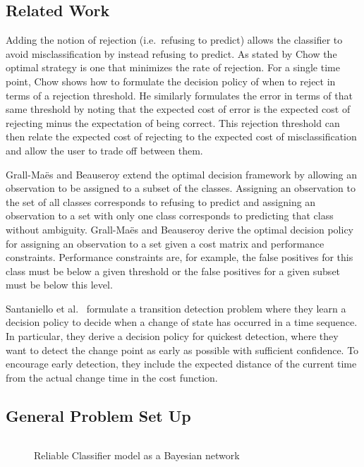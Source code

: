 \documentclass[12pt,solutions]{article}
\begin{document}
\subsection{Related Work}

Adding the notion of rejection (i.e.\  refusing to predict) allows the classifier to avoid misclassification by instead refusing to predict. As stated by Chow \cite{Chow1970} the optimal strategy is one that minimizes the rate of rejection. For a single time point, Chow shows how to formulate the decision policy of when to reject in terms of a rejection threshold. He similarly formulates the error in terms of that same threshold by noting that the expected cost of error is the expected cost of rejecting minus the expectation of being correct. This rejection threshold can then relate the expected cost of rejecting to the expected cost of misclassification and allow the user to trade off between them. 

Grall-Ma\"{e}s and  Beauseroy \cite{GrallMaes2009} extend the optimal decision framework by allowing an observation to be assigned to a subset of the classes. Assigning an observation to the set of all classes corresponds to refusing to predict and assigning an observation to a set with only one class corresponds to predicting that class without ambiguity. Grall-Ma\"{e}s and  Beauseroy derive the optimal decision policy for assigning an observation to a set given a cost matrix and performance constraints. Performance constraints are, for example, the false positives for this class must be below a given threshold or the false positives for a given subset must be below this level.

Santaniello et al.\ \cite{Santaniello2012} formulate a transition detection problem where they learn a decision policy to decide when a change of state has occurred in a time sequence. In particular, they derive a decision policy for quickest detection, where they want to detect the change point as early as possible with sufficient confidence. To encourage early detection, they include the expected distance of the current time from the actual change time in the cost function.

\subsection{General Problem Set Up}

\begin{figure}[ht]
  \begin{center}
    \begin{tabular}{cc}
      
    \end{tabular}
  \end{center}
  \caption{Reliable Classifier model as a Bayesian network}
\label{fig:reclas_bnet}
\end{figure}
\end{document}
